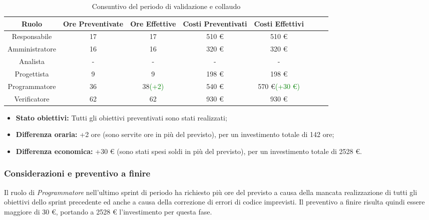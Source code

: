 \begin{table}[H]
		\begin{center}
			\setlength{\aboverulesep}{0pt}
			\setlength{\belowrulesep}{0pt}
			\setlength{\extrarowheight}{.75ex}
			\begin{tabular}{ c c c c c c c c }
				\rowcolor{AzzurroGruppo!30} 
				\textbf{Ruolo} & \textbf{Ore Preventivate} & \textbf{Ore Effettive} & \textbf{Costi Preventivati} & \textbf{Costi Effettivi}\\
				\toprule
				Responsabile   & 17 & 17 & 510 \euro{}  & 510 \euro{}\\
				Amministratore & 16 & 16 & 320 \euro{}  & 320 \euro{} \\
				Analista       & - & - & - & - \\
				Progettista    & 9 & 9 & 198 \euro{} & 198 \euro{} \\
				Programmatore  & 36 & 38\textcolor{green} {(+2)} & 540 \euro{}  & 570 \euro{}\textcolor{green}{(+30 \euro{})} \\
				Verificatore   & 62 & 62 & 930 \euro{}  & 930 \euro{} \\
				\bottomrule
			\end{tabular}
			\caption{Consuntivo del periodo di validazione e collaudo}
		\end{center}
	\end{table}
	
\begin{itemize}
	\item \textbf{Stato obiettivi:} Tutti gli obiettivi preventivati sono stati realizzati;
	\item \textbf{Differenza oraria:} +2 ore (sono servite ore in più del previsto), per un investimento totale di 142 ore;
	\item \textbf{Differenza economica:} +30 \euro{} (sono stati spesi soldi in più del previsto), per un investimento totale di 2528 \euro{}.
\end{itemize}

\subsubsection{Considerazioni e preventivo a finire}
Il ruolo di \textit{Programmatore} nell'ultimo sprint di periodo ha richiesto più ore del previsto a causa della mancata realizzazione di tutti gli obiettivi dello sprint precedente ed anche a causa della correzione di errori di codice imprevisti. \newline{}
Il preventivo a finire risulta quindi essere maggiore di 30 \euro{}, portando a 2528 \euro{} l'investimento per questa fase.

